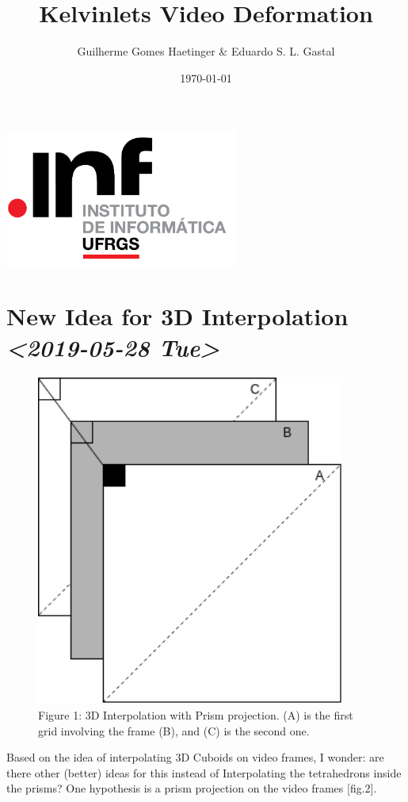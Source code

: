 \documentclass[11pt]{article}
\author{Guilherme Gomes Haetinger \& Eduardo S. L. Gastal}
\date{\today}
\title{Kelvinlets Video Deformation}
\begin{document}
\maketitle
\begin{center}
\includegraphics[width=3in]{res/inf.png}
\end{center}

\section*{New Idea for 3D Interpolation \textit{<2019-05-28 Tue>}}
\label{sec:orgb4c6988}

\begin{figure}[htbp]
\centering
\includegraphics[width=4in]{res/interpolationExample.png}
\caption{Figure 1: 3D Interpolation with Prism projection. (A) is the first grid involving the frame (B), and (C) is the second one.}
\end{figure}

Based on the idea of interpolating 3D Cuboids on video frames, I wonder: are there other (better) ideas for this instead of Interpolating the tetrahedrons inside the prisms? One hypothesis is a prism projection on the video frames [fig.2].
\end{document}
